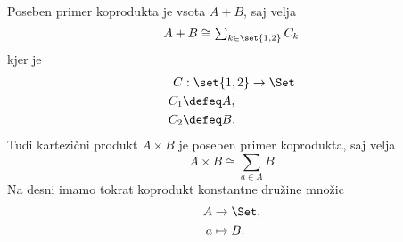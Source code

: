 Poseben primer koprodukta je vsota $A + B$, saj velja
%
\begin{equation*}
  A + B \cong \textstyle\sum_{k \in \set{1, 2}} C_k
\end{equation*}
%
kjer je
\begin{align*}
  C &: \set{1, 2} \to \Set \\
  C_1 &\defeq A, \\
  C_2 &\defeq B.
\end{align*}
%
Tudi kartezični produkt $A \times B$ je poseben primer koprodukta, saj velja
%
\begin{equation*}
    A \times B \cong \textstyle\sum_{a \in A} B
\end{equation*}
%
Na desni imamo tokrat koprodukt konstantne družine množic
%
\begin{align*}
  A &\to \Set, \\
  a &\mapsto B.
\end{align*}
